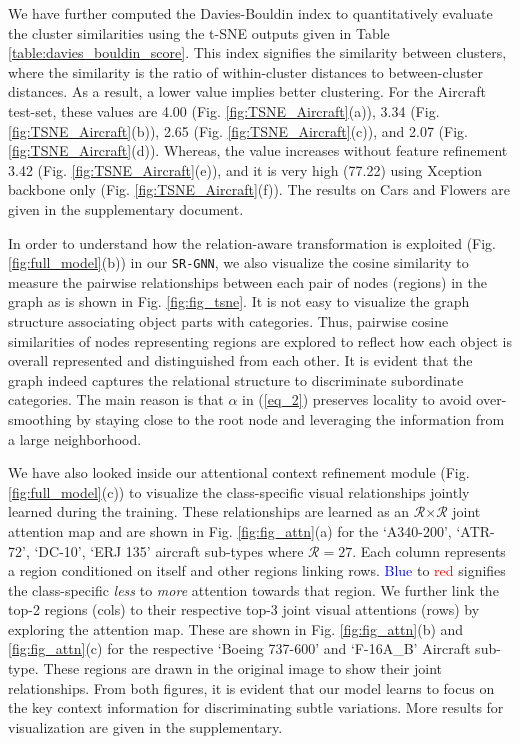 \documentclass[journal]{IEEEtran}
\begin{document}
We have further computed the Davies-Bouldin index \cite{davies1979cluster} to quantitatively evaluate the cluster similarities using the t-SNE outputs given in Table \ref{table:davies_bouldin_score}. This index signifies the similarity between clusters, where the similarity is the ratio of within-cluster distances to between-cluster distances. As a result, a lower value implies better clustering. For the Aircraft test-set, these values are 4.00 (Fig. \ref{fig:TSNE_Aircraft}(a)), 3.34 (Fig. \ref{fig:TSNE_Aircraft}(b)), 2.65 (Fig. \ref{fig:TSNE_Aircraft}(c)), and 2.07 (Fig. \ref{fig:TSNE_Aircraft}(d)). Whereas, the value increases without feature refinement 3.42 (Fig. \ref{fig:TSNE_Aircraft}(e)), and it is very high (77.22) using Xception backbone only (Fig. \ref{fig:TSNE_Aircraft}(f)). The results on Cars and Flowers are given in the supplementary document.   

In order to understand how the relation-aware transformation is exploited (Fig. \ref{fig:full_model}(b)) in our \texttt{SR-GNN}, we also visualize the cosine similarity to measure the pairwise relationships between each pair of nodes (regions) in the graph as is shown in Fig. \ref{fig:fig_tsne}. It is not easy to visualize the graph structure associating object parts with categories. Thus, pairwise cosine similarities of nodes representing regions are explored to reflect how each object is overall represented and distinguished from each other. It is evident that the graph indeed captures the relational structure to discriminate subordinate categories. The main reason is that $\alpha$ in (\ref{eq_2}) preserves locality to avoid over-smoothing by staying close to the root node and leveraging the information from a large neighborhood.

We have also looked inside our attentional context refinement module (Fig. \ref{fig:full_model}(c)) to visualize the class-specific visual relationships jointly learned during the training. These relationships are learned as an $\mathcal{R}$$\times$$\mathcal{R}$ joint attention map and are shown in Fig. \ref{fig:fig_attn}(a) for the `A340-200', `ATR-72', `DC-10', `ERJ 135' aircraft  sub-types where $\mathcal{R}$$=$$27$. Each column represents a region conditioned on itself and other regions linking rows. \textcolor{blue}{Blue} to \textcolor{red}{red} signifies the class-specific \textit{less} to \textit{more} attention towards that region. We further link the top-2 regions (cols) to their respective top-3 joint visual attentions (rows) by exploring the attention map. These are shown in Fig. \ref{fig:fig_attn}(b) and \ref{fig:fig_attn}(c) for the respective `Boeing 737-600' and `F-16A\_B' Aircraft sub-type. These regions are drawn in the original image to show their joint relationships. From both figures, it is evident that our model learns to focus on the key context information for discriminating subtle variations. More results for visualization are given in the supplementary.  
\end{document}
